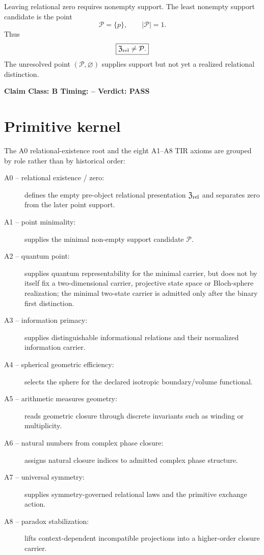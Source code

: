 \documentclass[11pt,a4paper,twoside]{book}
\theoremstyle{definition}
\newcommand{\vTwelveStatus}[3]{\par\noindent\textbf{Claim Class: #1 \quad Timing: #2 \quad Verdict: #3}\par}
\begin{document}
Leaving relational zero requires nonempty support. The least nonempty support candidate is the point
\begin{equation}
\boxed{
\mathcal P=\{p\},
\qquad
|\mathcal P|=1.
}
\label{eq:v12_minimal_point_support}
\end{equation}
Thus
\begin{equation}
\boxed{
\mathfrak Z_{\rm rel}\neq\mathcal P.
}
\end{equation}
The unresolved point $(\mathcal P,\varnothing)$ supplies support but not yet a realized relational distinction.
\vTwelveStatus{B}{--}{PASS}

\section{Primitive kernel}

The A0 relational-existence root and the eight A1--A8 TIR axioms are grouped by role rather than by historical order:
\begin{description}
\item[A0 -- relational existence / zero:] defines the empty pre-object relational presentation $\mathfrak Z_{\rm rel}$ and separates zero from the later point support.
\item[A1 -- point minimality:] supplies the minimal non-empty support candidate $\mathcal P$.
\item[A2 -- quantum point:] supplies quantum representability for the minimal carrier, but does not by itself fix a two-dimensional carrier, projective state space or Bloch-sphere realization; the minimal two-state carrier is admitted only after the binary first distinction.
\item[A3 -- information primacy:] supplies distinguishable informational relations and their normalized information carrier.
\item[A4 -- spherical geometric efficiency:] selects the sphere for the declared isotropic boundary/volume functional.
\item[A5 -- arithmetic measures geometry:] reads geometric closure through discrete invariants such as winding or multiplicity.
\item[A6 -- natural numbers from complex phase closure:] assigns natural closure indices to admitted complex phase structure.
\item[A7 -- universal symmetry:] supplies symmetry-governed relational laws and the primitive exchange action.
\item[A8 -- paradox stabilization:] lifts context-dependent incompatible projections into a higher-order closure carrier.
\end{description}
\end{document}

